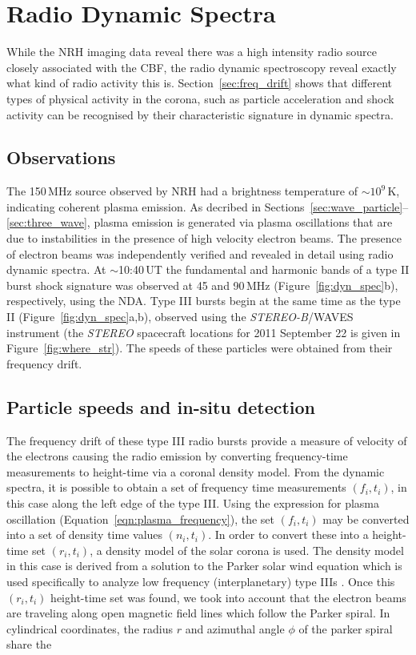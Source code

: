 \section{Radio Dynamic Spectra}\label{sec:20}

While the NRH imaging data reveal there was a high intensity radio source closely associated with the CBF, the radio dynamic spectroscopy reveal exactly what kind of radio activity this is. Section~\ref{sec:freq_drift} shows that different types of physical activity in the corona, such as particle acceleration and shock activity can be recognised by their characteristic signature in dynamic spectra. 

\subsection{Observations}
The 150\,MHz source observed by NRH had a brightness temperature of $\sim$$10^9$\,K, indicating coherent plasma emission. As decribed in Sections~\ref{sec:wave_particle}--\ref{sec:three_wave}, plasma emission is generated via plasma oscillations that are due to instabilities in the presence of high velocity electron beams. The presence of electron beams was independently verified and revealed in detail using radio dynamic spectra. At $\sim$10:40\,UT the fundamental and harmonic bands of a type II burst shock signature was observed at 45 and 90\,MHz (Figure~\ref{fig:dyn_spec}b), respectively, using the NDA. Type III bursts begin at the same time as the type II (Figure~\ref{fig:dyn_spec}a,b), observed using the \emph{STEREO-B}/WAVES instrument {\color{black}(the \emph{STEREO} spacecraft locations for 2011 September 22 is given in Figure~\ref{fig:where_str})}. The speeds of these particles were obtained from their frequency drift.

\subsection{Particle speeds and in-situ detection}
The frequency drift of these type III radio bursts provide a measure of velocity of the electrons causing the radio emission by converting frequency-time measurements to height-time via a coronal density model. From the dynamic spectra, it is possible to obtain a set of frequency time measurements $(f_i,t_i)$, in this case along the left edge of the type III. Using the expression for plasma oscillation (Equation~\ref{eqn:plasma_frequency}), the set $(f_i,t_i)$ may be converted into a set of density time values $(n_i,t_i)$. In order to convert these into a height-time set $(r_i,t_i)$, a density model of the solar corona is used. The density model in this case is derived from a solution to the Parker solar wind equation which is used specifically to analyze low frequency (interplanetary) type IIIs \citep{Mann1999}. Once this $(r_i,t_i)$ height-time set was found, we took into account that the electron beams are traveling along open magnetic field lines which follow the Parker spiral. In cylindrical coordinates, the radius $r$ and azimuthal angle $\phi$ of the parker spiral share the

